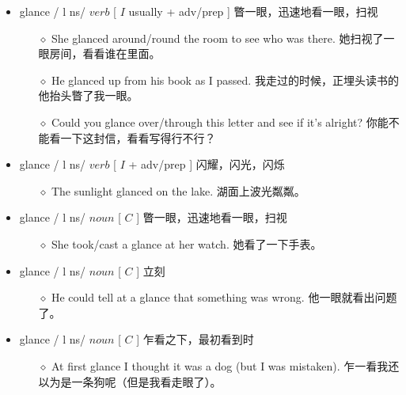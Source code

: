\documentclass[a4paper,top=2.5cm,buttom=2.5cm10.5pt]{book}
\begin{document}
\begin{itemize}
\item glance / \textscriptg l \textscripta  \textlengthmark ns/ $ verb $ [  $ I $  usually + adv/prep ] 瞥一眼，迅速地看一眼，扫视
\begin{itemize}
\item[$\diamond$] She glanced around/round the room to see who was there.
她扫视了一眼房间，看看谁在里面。
\item[$\diamond$] He glanced up from his book as I passed.
我走过的时候，正埋头读书的他抬头瞥了我一眼。
\item[$\diamond$] Could you glance over/through this letter and see if it's alright?
你能不能看一下这封信，看看写得行不行？
\end{itemize}
\end{itemize}
\begin{itemize}
\item glance / \textscriptg l \textscripta  \textlengthmark ns/ $ verb $ [  $ I $  + adv/prep ] 闪耀，闪光，闪烁
\begin{itemize}
\item[$\diamond$] The sunlight glanced on the lake.
湖面上波光粼粼。
\end{itemize}
\end{itemize}
\begin{itemize}
\item glance / \textscriptg l \textscripta  \textlengthmark ns/ $ noun $ [  $ C $  ] 瞥一眼，迅速地看一眼，扫视
\begin{itemize}
\item[$\diamond$] She took/cast a glance at her watch.
她看了一下手表。
\end{itemize}
\end{itemize}
\begin{itemize}
\item glance / \textscriptg l \textscripta  \textlengthmark ns/ $ noun $ [  $ C $  ] 立刻
\begin{itemize}
\item[$\diamond$] He could tell at a glance that something was wrong.
他一眼就看出问题了。
\end{itemize}
\end{itemize}
\begin{itemize}
\item glance / \textscriptg l \textscripta  \textlengthmark ns/ $ noun $ [  $ C $  ] 乍看之下，最初看到时
\begin{itemize}
\item[$\diamond$] At first glance I thought it was a dog (but I was mistaken).
乍一看我还以为是一条狗呢（但是我看走眼了）。
\end{itemize}
\end{itemize}
\end{document}
